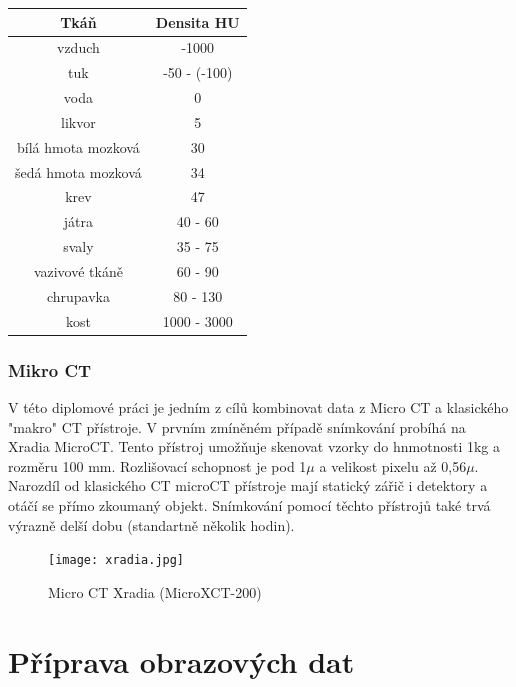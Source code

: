 \documentclass{thesis}%
\begin{document}
\begin{center}
\begin{tabular}{c|c}
 \centering
\bfseries \bfseries Tkáň & \bfseries Densita HU\\
\hline \hline
vzduch                      & -1000\\
tuk                            & -50 - (-100)\\
voda                         & 0\\
likvor                         & 5\\
bílá hmota mozková  & 30\\
šedá hmota mozková& 34\\
krev                           & 47\\
játra                          & 40 - 60\\
svaly                         & 35 - 75\\
vazivové tkáně         & 60 - 90\\
chrupavka                 & 80 - 130 \\
kost                           & 1000 - 3000 
\end{tabular}
\end{center}
\subsection{Mikro CT}
V této diplomové práci je jedním z cílů kombinovat data z Micro CT a klasického "makro" CT přístroje. V prvním zmíněném případě snímkování probíhá na Xradia MicroCT. Tento přístroj umožňuje skenovat vzorky do hnmotnosti 1kg a rozměru 100 mm. Rozlišovací schopnost je pod 1$\mu$  a velikost pixelu až 0,56$\mu$. Narozdíl od klasického CT microCT přístroje mají statický zářič i detektory a otáčí se přímo zkoumaný objekt. Snímkování pomocí těchto přístrojů také trvá výrazně delší dobu (standartně několik hodin).
\begin{figure}[ht!]
 \centering
	\texttt{[image: xradia.jpg]}
	\caption[Micro CT Xradia]{Micro CT Xradia (MicroXCT-200) }
\end{figure}

\chapter{Příprava obrazových dat}
\end{document}
